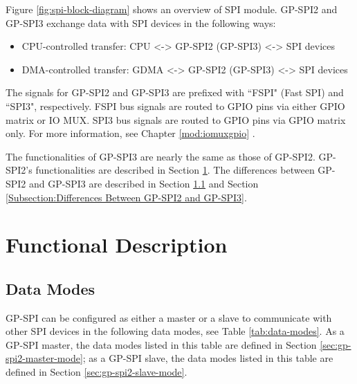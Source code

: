 \documentclass[main\_\_EN.tex]{subfiles}
\begin{document}
Figure \ref{fig:spi-block-diagram} shows an overview of SPI module. GP-SPI2 and GP-SPI3 exchange data with SPI devices in the following ways:
\begin{itemize}
    \item CPU-controlled transfer: CPU <-> GP-SPI2 (GP-SPI3) <-> SPI devices
    \item DMA-controlled transfer: GDMA <-> GP-SPI2 (GP-SPI3) <-> SPI devices
\end{itemize}

The signals for GP-SPI2 and GP-SPI3 are prefixed with ``FSPI" (Fast SPI) and ``SPI3", respectively.
FSPI bus signals are routed to GPIO pins via either GPIO matrix or IO MUX. SPI3 bus signals are routed to GPIO pins via GPIO matrix only. For more information, see Chapter \ref{mod:iomuxgpio} \textit{}.

The functionalities of GP-SPI3 are nearly the same as those of GP-SPI2. GP-SPI2's functionalities are described in Section \ref{sec:gp-spi-interfaces}. The differences between GP-SPI2 and GP-SPI3 are described in Section \ref{Subsection:data-modes} and Section \ref{Subsection:Differences Between GP-SPI2 and GP-SPI3}.

\section{Functional Description}\label{sec:gp-spi-interfaces}

\subsection{Data Modes}\label{Subsection:data-modes}
GP-SPI can be configured as either a master or a slave to communicate with other SPI devices in the following data modes, see Table \ref{tab:data-modes}. As a GP-SPI master, the data modes listed in this table are defined in Section \ref{sec:gp-spi2-master-mode};
as a GP-SPI slave, the data modes listed in this table are defined in Section \ref{sec:gp-spi2-slave-mode}.
\end{document}
